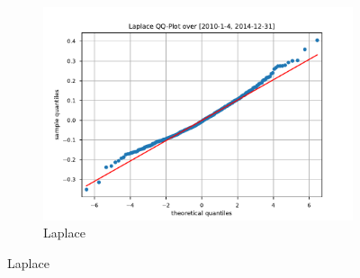 \begin{figure}[htbp]
\begin{subfigure}[b]{0.32\textwidth}
        \includegraphics[width=\textwidth]{content/reschap4/Figures/laplace_QQ_2010-1-4-2014-12-31.pdf}
        \caption{Laplace}
    \end{subfigure}


\end{figure}
